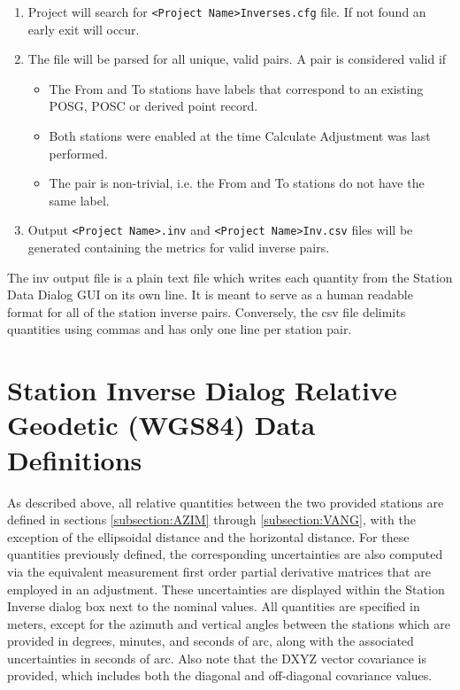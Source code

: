 \begin{enumerate}
	\item Project will search for \verb+<Project Name>Inverses.cfg+ file. If not found an early exit will occur.
	\item The file will be parsed for all unique, valid pairs. A pair is considered valid if
	\begin{itemize}
		\item The From and To stations have labels that correspond to an existing POSG, POSC or derived point record.
		\item Both stations were enabled at the time Calculate Adjustment was last performed.
		\item The pair is non-trivial, i.e. the From and To stations do not have the same label. 
	\end{itemize}
	\item Output \verb+<Project Name>.inv+ and \verb+<Project Name>Inv.csv+ files will be generated containing the metrics for valid inverse pairs.
\end{enumerate}

The inv output file is a plain text file which writes each quantity from the Station Data Dialog GUI on its own line. It is meant to serve as a human readable format for all of the station inverse pairs. Conversely, the csv file delimits quantities using commas and has only one line per station pair. 

\section{Station Inverse Dialog Relative Geodetic (WGS84) Data Definitions}

As described above, all relative quantities between the two provided stations are defined in sections \ref{subsection:AZIM} through \ref{subsection:VANG}, with the exception of the ellipsoidal distance and the horizontal distance.  For these quantities previously defined, the corresponding uncertainties are also computed via the equivalent measurement first order partial derivative matrices that are employed in an adjustment.  These uncertainties are displayed within the Station Inverse dialog box next to the nominal values.  All quantities are specified in meters, except for the azimuth and vertical angles between the stations which are provided in degrees, minutes, and seconds of arc, along with the associated uncertainties in seconds of arc.  Also note that the DXYZ vector covariance is provided, which includes both the diagonal and off-diagonal covariance values. 

